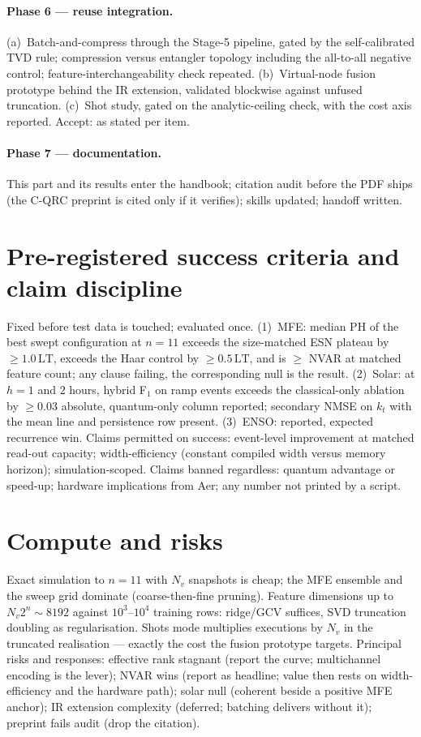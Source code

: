 \paragraph{Phase 6 --- reuse integration.} (a)~Batch-and-compress through
the Stage-5 pipeline, gated by the self-calibrated TVD rule; compression
versus entangler topology including the all-to-all negative control;
feature-interchangeability check repeated. (b)~Virtual-node fusion
prototype behind the IR extension, validated blockwise against unfused
truncation. (c)~Shot study, gated on the analytic-ceiling check, with the
cost axis reported. Accept: as stated per item.

\paragraph{Phase 7 --- documentation.} This part and its results enter the
handbook; citation audit before the PDF ships (the C-QRC preprint is cited
only if it verifies); skills updated; handoff written.

\section{Pre-registered success criteria and claim discipline}
\label{sec:rfqrc-prereg}

Fixed before test data is touched; evaluated once. (1)~MFE: median PH of
the best swept configuration at $n=11$ exceeds the size-matched ESN plateau
by $\ge1.0\,\mathrm{LT}$, exceeds the Haar control by
$\ge0.5\,\mathrm{LT}$, and is $\ge$ NVAR at matched feature count; any
clause failing, the corresponding null is the result. (2)~Solar: at
$h=1$ and $2$ hours, hybrid F$_1$ on ramp events exceeds the classical-only
ablation by $\ge0.03$ absolute, quantum-only column reported; secondary
NMSE on $k_t$ with the mean line and persistence row present. (3)~ENSO:
reported, expected recurrence win. Claims permitted on success: event-level
improvement at matched read-out capacity; width-efficiency (constant
compiled width versus memory horizon); simulation-scoped. Claims banned
regardless: quantum advantage or speed-up; hardware implications from Aer;
any number not printed by a script.

\section{Compute and risks}
\label{sec:rfqrc-risks}

Exact simulation to $n=11$ with $N_v$ snapshots is cheap; the MFE ensemble
and the sweep grid dominate (coarse-then-fine pruning). Feature dimensions
up to $N_v 2^n\sim8192$ against $10^3$--$10^4$ training rows: ridge/GCV
suffices, SVD truncation doubling as regularisation. Shots mode multiplies
executions by $N_v$ in the truncated realisation --- exactly the cost the
fusion prototype targets. Principal risks and responses: effective rank
stagnant (report the curve; multichannel encoding is the lever); NVAR wins
(report as headline; value then rests on width-efficiency and the hardware
path); solar null (coherent beside a positive MFE anchor); IR extension
complexity (deferred; batching delivers without it); preprint fails audit
(drop the citation).
